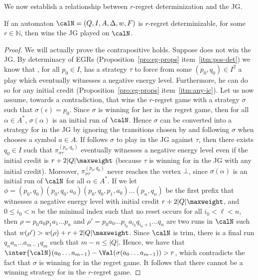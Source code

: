 \documentclass[a4paper]{article}
\begin{document}
We now establish a relationship between $r$-regret determinization and the JG.
\begin{lemma}\label{lem:joker-nec-regret}
	If an automaton $\calN = (Q,I,A,\Delta,w,F)$ is $r$-regret
	determinizable, for some $r \in \mathbb{N}$, then \eve wins the JG
	played on $\calN$.
\end{lemma}
\begin{proof}
	We will actually prove the contrapositive holds.  Suppose \eve does not
	win the JG. By determinacy of EGRs (Proposition~\ref{pro:eg-props}
	item~\ref{itm:pos-det}) we know that \adam, for all $p_0 \in I$, has a
	strategy $\tau$ to force from some $(p_0,q_0) \in I^2$ a play
	which eventually witnesses a negative energy level.  Furthermore, he can
	do so for any initial credit
	(Proposition~\ref{pro:eg-props} item~\ref{itm:any-ic}). Let us now
	assume, towards a contradiction, that \eve wins the $r$-regret game with
	a strategy $\sigma$ such that $\sigma(\epsilon) = p_0$.
	Since $\sigma$ is winning for her in the regret game,
	then for all $\alpha \in A^*$, $\sigma(\alpha)$ is an initial run of
	$\calN$. Hence $\sigma$ can be converted into a strategy for \eve in the
	JG by ignoring the transitions chosen by \adam and following $\sigma$
	when \adam chooses a symbol $a \in A$.
	If \eve follows $\sigma$ to play
	in the JG against $\tau$, then there exists $q_0 \in I$ such that
	$\pi^{(p_0,q_0)}_{\sigma \tau}$ eventually witnesses a
	negative energy level even if the initial credit is $r + 2|Q|\maxweight$
	(because $\tau$ is winning for \adam in the JG with any initial credit).
	Moreover, $\pi^{(p_0,q_0)}_{\sigma \tau}$ never reaches the vertex
	$\bot$, since $\sigma(\alpha)$ is an initial run of $\calN$ for all
	$\alpha \in A^*$.
	If we let $\phi = (p_0,q_0) (p_0,q_0,a_0) (p_0,q_0,p_1,a_0) \dots
	(p_n,q_n)$ be the first prefix that witnesses a negative energy level
	with initial credit $r + 2|Q|\maxweight$, and $0 \le i_0 < n$ be the
	minimal index such that no reset occurs for all $i_0 < \ell < n$, then
	$\rho = p_0 a_0 p_1 a_1 \dots p_n$ and $\rho' = p_0 a_0 \dots p_{i_0}
	a_{i_0} q_{i_0 + 1} \dots q_n$ are two runs in $\calN$ such that
	$w(\rho') > w(\rho) + r + 2|Q|\maxweight$. Since
	$\calN$ is trim, there is a final run $q_n a_n \dots a_{m-1} q_m$
	such that $m - n \le |Q|$.  Hence, we have that $\inter{\calN}(a_0 \dots
	a_{m-1}) - \Val(\sigma(a_0 \dots a_{m-1}))  > r$, which contradicts the
	fact that $\sigma$ is winning for \eve in the regret game. It follows
	that there cannot be a winning strategy for \eve in the $r$-regret game.
\end{proof}
\end{document}
